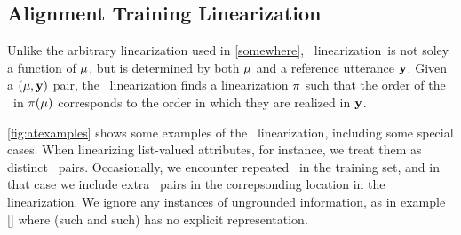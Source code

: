\subsection{Alignment Training Linearization}
%
%
Unlike the {\color{red}arbitrary linearization} used in \autoref{somewhere}, \alignmenttraining~linearization~is not soley a function of $\mu$, but is determined by both $\mu$ and a reference utterance $\mathbf{y}$. Given a $\left(\mu, \mathbf{y}\right)$ pair, the \alignmenttraining~linearization finds a linearization
$\pi$ such that the order of the \attributevalues~in $\pi(\mu)$ corresponds
to the order in which they are realized in $\mathbf{y}$. %


\autoref{fig:atexamples} shows some examples of the 
\alignmenttraining~linearization, including some special cases. When
linearizing list-valued attributes, for instance, we treat them as distinct
\attributevalue~pairs. Occasionally, we encounter repeated \attributevalues~in the training set, and in that case we include extra \attributevalue~pairs
in the correpsonding location in the linearization. We ignore any instances
of  ungrounded information, as in example \autoref{} where (such and such)
has no explicit representation.  


%


